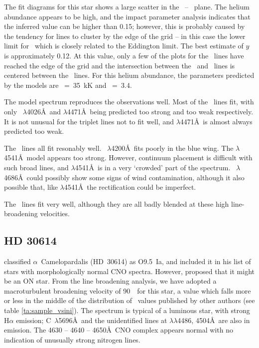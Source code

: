 The fit diagrams for this star shows a large scatter in the \teff\ --
\logg\ plane. The helium abundance appears to be high, and the impact
parameter analysis indicates that the inferred value can be higher
than 0.15; however, this is probably caused by the tendency for lines
to cluster by the edge of the grid -- in this case the lower limit for
\logg\ which is closely related to the Eddington limit. The best
estimate of $y$ is approximately 0.12. At this value, only a few of
the plots for the \hei\ lines have reached the edge of the grid and
the intersection between the \hi\ and \heii\ lines is centered between
the \hei\ lines. For this helium abundance, the parameters predicted
by the models are \teff~=~35~kK and \logg~=~3.4.

The model spectrum reproduces the observations well. Most of the \hei\
lines fit, with only \hei~$\lambda$4026\AA\ and $\lambda$4471\AA\
being predicted too strong and too weak respectively.  It is not
unusual for the triplet lines not to fit well, and $\lambda$4471\AA\
is almost always predicted too weak.

The \heii\ lines all fit resonably well. \heii~$\lambda$4200\AA\ fits
poorly in the blue wing. The $\lambda$4541\AA\ model appears too
strong. However, continuum placement is difficult with such broad
lines, and $\lambda$4541\AA\ is in a very `crowded' part of the
spectrum. \heii~$\lambda$4686\AA\ could possibly show some signs of
wind contamination, although it also possible that, like
$\lambda$4541\AA\, the rectification could be imperfect.

The \hi\ lines fit very well, although they are all badly blended at
these high line-broadening velocities.

\subsection{HD 30614}  %
\label{analysis:hd030614}

\ybcite{wa:76} classified $\alpha$~Camelopardalis (HD~30614) as O9.5~Ia, and
included it in his list of stars with morphologically normal CNO spectra.  
However,
\ybcite{bi:82} proposed that it might be an ON star. From the line
broadening analysis, we have adopted a macroturbulent broadening
velocity of 90~\kms\ for this star, a value which falls more or less
in the middle of the distribution of \vsini\ values published by other
authors (see table \ref{ta:sample_vsini}). The spectrum is typical of
a luminous star, with strong H$\alpha$ emission;
C\scr{3}~$\lambda$5696\AA\ and the unidentified lines at
$\lambda\lambda$4486, 4504\AA\ are also in emission. The 4630 -- 4640
-- 4650\AA\ CNO complex appears normal with no indication of unusually
strong nitrogen lines.

